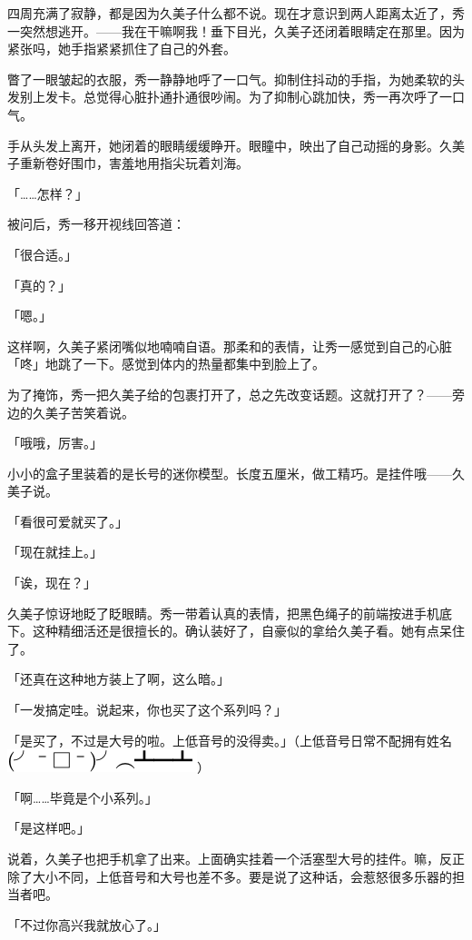 \documentclass[UTF8]{ctexart}
\begin{document}
    四周充满了寂静，都是因为久美子什么都不说。现在才意识到两人距离太近了，秀一突然想逃开。——我在干嘛啊我！垂下目光，久美子还闭着眼睛定在那里。因为紧张吗，她手指紧紧抓住了自己的外套。

    瞥了一眼皱起的衣服，秀一静静地呼了一口气。抑制住抖动的手指，为她柔软的头发别上发卡。总觉得心脏扑通扑通很吵闹。为了抑制心跳加快，秀一再次呼了一口气。

    手从头发上离开，她闭着的眼睛缓缓睁开。眼瞳中，映出了自己动摇的身影。久美子重新卷好围巾，害羞地用指尖玩着刘海。

    「……怎样？」

    被问后，秀一移开视线回答道：

    「很合适。」

    「真的？」

    「嗯。」

    这样啊，久美子紧闭嘴似地喃喃自语。那柔和的表情，让秀一感觉到自己的心脏「咚」地跳了一下。感觉到体内的热量都集中到脸上了。

    为了掩饰，秀一把久美子给的包裹打开了，总之先改变话题。这就打开了？——旁边的久美子苦笑着说。

    「哦哦，厉害。」

    小小的盒子里装着的是长号的迷你模型。长度五厘米，做工精巧。是挂件哦——久美子说。

    「看很可爱就买了。」

    「现在就挂上。」

    「诶，现在？」

    久美子惊讶地眨了眨眼睛。秀一带着认真的表情，把黑色绳子的前端按进手机底下。这种精细活还是很擅长的。确认装好了，自豪似的拿给久美子看。她有点呆住了。

    「还真在这种地方装上了啊，这么暗。」

    「一发搞定哇。说起来，你也买了这个系列吗？」

    「是买了，不过是大号的啦。上低音号的没得卖。」（上低音号日常不配拥有姓名\includegraphics[scale=0.8]{ywz.pdf}）

    「啊……毕竟是个小系列。」

    「是这样吧。」

    说着，久美子也把手机拿了出来。上面确实挂着一个活塞型大号的挂件。嘛，反正除了大小不同，上低音号和大号也差不多。要是说了这种话，会惹怒很多乐器的担当者吧。

    「不过你高兴我就放心了。」
\end{document}
